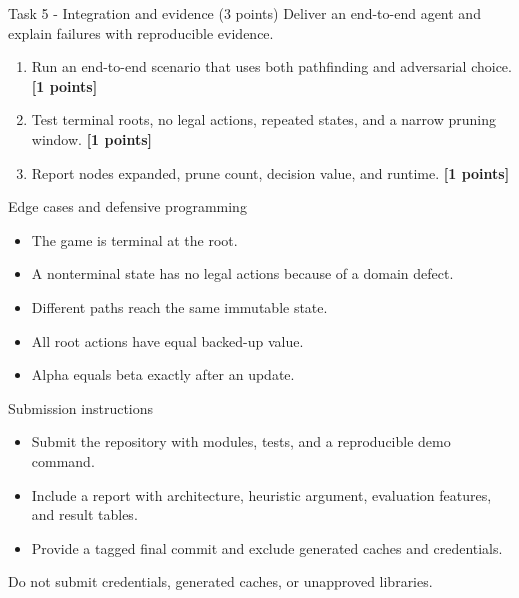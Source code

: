 \documentclass[aspectratio=169,11pt]{beamer}
\begin{document}
\begin{frame}{Task 5 - Integration and evidence (3 points)}
\small
Deliver an end-to-end agent and explain failures with reproducible evidence.

\vspace{0.2cm}
\begin{enumerate}
\item[\textbf{a.}] Run an end-to-end scenario that uses both pathfinding and adversarial choice. \hfill{\color{courseblue}\textbf{[1 points]}}
\item[\textbf{b.}] Test terminal roots, no legal actions, repeated states, and a narrow pruning window. \hfill{\color{courseblue}\textbf{[1 points]}}
\item[\textbf{c.}] Report nodes expanded, prune count, decision value, and runtime. \hfill{\color{courseblue}\textbf{[1 points]}}
\end{enumerate}
\end{frame}

\begin{frame}{Edge cases and defensive programming}
\small
\begin{itemize}
  \item The game is terminal at the root.
  \item A nonterminal state has no legal actions because of a domain defect.
  \item Different paths reach the same immutable state.
  \item All root actions have equal backed-up value.
  \item Alpha equals beta exactly after an update.
\end{itemize}
\end{frame}

\begin{frame}{Submission instructions}
\small
\begin{itemize}
  \item Submit the repository with modules, tests, and a reproducible demo command.
  \item Include a report with architecture, heuristic argument, evaluation features, and result tables.
  \item Provide a tagged final commit and exclude generated caches and credentials.
\end{itemize}
\vspace{0.2cm}
\alert{Do not submit credentials, generated caches, or unapproved libraries.}
\end{frame}
\end{document}
